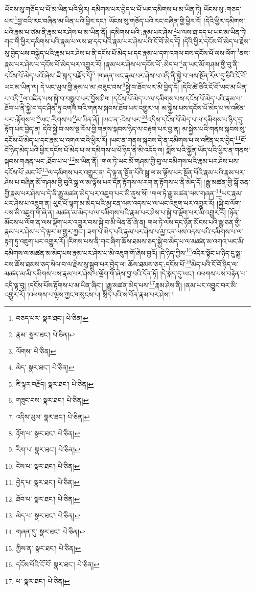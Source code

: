 ཡོངས་སུ་གཅོད་པ་པོ་མ་ཡིན་པའི་ཕྱིར། དམིགས་པར་བྱེད་པ་པོ་ཡང་དམིགས་པ་མ་ཡིན་ཏེ། ཡོངས་སུ་:གཅད་པར་\footnote{བཅད་པར་  སྣར་ཐང་།  པེ་ཅིན། }བྱ་བའི་རང་བཞིན་མ་ཡིན་པའི་ཕྱིར་དང་། ཡོངས་སུ་གཅོད་པའི་རང་བཞིན་གྱི་ཕྱིར་རོ། །དེའི་ཕྱིར་དམིགས་པའི་རྣམ་པ་ཙམ་ནི་རྣམ་པར་ཤེས་པ་མ་ཡིན་ནོ། །དམིགས་པའི་:རྣམ་པར་ཤེས་\footnote{རྣམ་  སྣར་ཐང་།  པེ་ཅིན། }པ་ལས་ཐ་དད་པ་ཡང་མ་ཡིན་ཏེ། གང་གི་ཕྱིར་དམིགས་པའི་རྣམ་པ་ལས་ཐ་དད་པའི་རྣམ་པར་ཤེས་པའི་ངོ་བོ་མེད་དོ། །དེའི་ཕྱིར་དངོས་པོ་མེད་པ་རྗེས་སུ་བྱེད་པས་བསྐྱེད་པའི་རྣམ་པར་ཤེས་པ་ནི་དངོས་པོ་མེད་པ་དང་རྣམ་པ་དག་འགལ་བས་དངོས་པོ་ལས་ལོག་\footnote{ལོགས་  པེ་ཅིན། }ནས་རྣམ་པར་ཤེས་པ་དངོས་པོ་མེད་པར་འགྱུར་རོ། །རྣམ་པར་ཤེས་པ་དངོས་པོ་:མེད་པ་\footnote{མེད་  སྣར་ཐང་།  པེ་ཅིན། }ན་ཡང་མོ་གཤམ་གྱི་བུ་ནི་དངོས་པོ་མེད་པའོ་ཞེས་:ཇི་སྐད་བརྗོད་དོ།\footnote{ཇི་ལྟར་བརྗོད།  སྣར་ཐང་།  པེ་ཅིན། } །གཞན་ཡང་རྣམ་པར་ཤེས་པ་འདི་ནི་སྐྱེ་བ་ལས་སྔོན་རོལ་དུ་ཅིའི་ངོ་བོ་ཡང་མ་ཡིན་ལ། དེ་ཡང་ཡུལ་གྱི་རྣམ་པ་མ་:བཟུང་བས་\footnote{གཟུང་བས་  སྣར་ཐང་།  པེ་ཅིན། }སྐྱེ་བ་ཐོབ་པར་མི་བྱེད་དོ། །དེའི་ཚེ་ཅིའི་ངོ་བོ་ཡང་མ་ཡིན་པ་འདི་\footnote{འདིས་ཡུལ་  སྣར་ཐང་།  པེ་ཅིན། }ལ་འཛིན་པས་སྐྱེ་བ་བསྒྲུབ་པར་བྱོས་ཤིག །དངོས་པོ་མེད་པ་ལ་དམིགས་པས་དངོས་པོ་མེད་པའི་རྣམ་པ་ཐོབ་པ་ནི་སྐྱེ་བ་དང་ཤིན་ཏུ་འགལ་བའི་གནས་སྐབས་ཐོབ་པར་འགྱུར་ལ། མ་སྐྱེས་པས་དངོས་པོ་མེད་པ་ལ་འཛིན་པར་:རྟོགས་པ་\footnote{རྟོག་པ་  སྣར་ཐང་།  པེ་ཅིན། }ཡང་:རིགས་པ་\footnote{རིག་པ་  སྣར་ཐང་།  པེ་ཅིན། }མ་ཡིན་ནོ། །ཡང་ན་:ངེས་པར་\footnote{ངེས་པ་  སྣར་ཐང་།  པེ་ཅིན། }འདིས་དངོས་པོ་མེད་པ་ལ་དམིགས་པ་ཉིད་དུ་རྟོག་པར་བྱེད་ན། དེའི་སྐྱེ་བ་ལས་སྔ་རོལ་གྱི་གནས་སྐབས་ཉིད་ལ་བརྟག་པར་བྱ་ན། མ་སྐྱེས་པའི་གནས་སྐབས་སུ་དངོས་པོ་མེད་པ་དང་རྣམ་པ་འགལ་བའི་ཕྱིར་རོ། །ཡང་ན་གནས་སྐབས་དེ་ན་དམིགས་པ་ལ་འཛིན་པར་བྱེད་\footnote{བྱེད་པ་  སྣར་ཐང་།  པེ་ཅིན། }ངོ་བོ་ཉིད་མེད་པའི་ཕྱིར་དངོས་པོ་མེད་པ་ལ་དམིགས་པ་པོ་ཉིད་ནི་མི་འདོད་ལ། སྨོས་པའི་སྐྱོན་ཡོད་པའི་ཕྱིར་ན་གནས་སྐབས་གཞན་ཡང་:ཐོབ་པ་པ་\footnote{ཐོབ་པ་  སྣར་ཐང་།  པེ་ཅིན། }མ་ཡིན་ནོ། །གལ་ཏེ་ཡང་མོ་གཤམ་གྱི་བུ་ལ་དམིགས་པའི་རྣམ་པར་ཤེས་པས་དངོས་པོ་:མང་པོ་\footnote{མེད་པ་  སྣར་ཐང་།  པེ་ཅིན། }ལ་དམིགས་པར་འགྱུར་ན། དེ་ལྟ་ན་སྔོན་པོའི་སྒྲ་ལ་མ་ལྟོས་པར་སྔོན་པོའི་རྣམ་པའི་རྣམ་པར་ཤེས་པ་བཞིན་མོ་གཤམ་གྱི་བུའི་སྒྲ་ལ་མ་ལྟོས་པར་དོན་རྟོགས་ལ་རག་ན་རྟོགས་པ་ནི་མེད་དོ། །རྒྱུ་མཚན་གྱི་སྒོ་ཅན་གྱི་རྣམ་པར་ཤེས་པ་དེ་ནི་རྒྱུ་མཚན་མེད་པར་འཇུག་པར་མི་ནུས་སོ། །གལ་ཏེ་རྒྱུ་མཚན་ལས་གཞན་\footnote{གཞན་དུ་  སྣར་ཐང་།  པེ་ཅིན། }ཡང་རྣམ་པར་ཤེས་པ་འཇུག་ན། ཕུང་པོ་ལྷག་མ་མེད་པའི་མྱ་ངན་ལས་འདས་པ་ལ་ཡང་འཇུག་པར་འགྱུར་རོ། །སྐྱེ་བ་ལོག་པས་མི་འཇུག་གོ་ཞེ་ན། མཚན་མ་མེད་པ་ལ་དམིགས་པའི་རྣམ་པར་ཤེས་པ་སྐྱེ་བ་ལྡོག་པར་མི་འགྱུར་རོ། །ཉོན་མོངས་པ་ལོག་ན་ལས་ལྡོག་པར་འགྱུར་བས་སྐྱེ་བ་མི་ལེན་ནོ་ཞེ་ན། གལ་ཏེ་ལས་དང་ཉོན་མོངས་པའི་རྒྱུ་ཅན་གྱི་རྣམ་པར་ཤེས་པ་དེ་ལྟར་མ་གྱུར་ཀྱང་། ཟག་པ་མེད་པའི་རྣམ་པར་ཤེས་པ་མྱ་ངན་ལས་འདས་པའི་དམིགས་པ་ལ་རྟག་ཏུ་འཇུག་པར་འགྱུར་རོ། །རིགས་པས་ནི་གང་ཞིག་ཆོས་ཐམས་ཅད་སྐྱེ་བ་མེད་པ་ལ་མཚན་མ་འགའ་ཡང་མི་དམིགས་ལ་མཚན་མ་མེད་པས་རྣམ་པར་ཤེས་པ་མི་འཇུག་གོ་ཞེས་བྱའོ། །དེ་ཉིད་ཀྱིས་\footnote{ཀྱིས་ན་  སྣར་ཐང་།  པེ་ཅིན། }འདིར་སྟོང་པ་ཉིད་དུ་སྨྲ་བས་ཆོས་ཐམས་ཅད་སེལ་བ་ལ་རྗེས་སུ་སྒྲུབ་པར་བྱེད་ལ། ཆོས་ཐམས་ཅད་:དངོས་པོ་\footnote{དངོས་པོའི་ངོ་བོ་  སྣར་ཐང་།  པེ་ཅིན། }མེད་པའི་ངོ་བོ་ཉིད་ལ་མཚན་མ་མི་དམིགས་པས་རྣམ་པར་ཤེས་པ་ལྡོག་གོ་ཞེས་བྱ་བའི་དོན་ཏོ། །དེ་སྐད་དུ་ཡང་། འཕགས་པས་བརྟེན་པ་འདི་ལྟ་བུ། །དངོས་པོས་རྟོགས་པ་མ་ཡིན་ཞིང་། །རྒྱུ་མཚན་མེད་པས་\footnote{པ་  སྣར་ཐང་།  པེ་ཅིན། }རྣམ་ཤེས་ནི། །ནམ་ཡང་འབྱུང་བར་མི་འགྱུར་རོ། །འཕགས་པ་ལྷས་ཀྱང་གསུངས་པ། སྲིད་པའི་ས་བོན་རྣམ་པར་ཤེས། །
